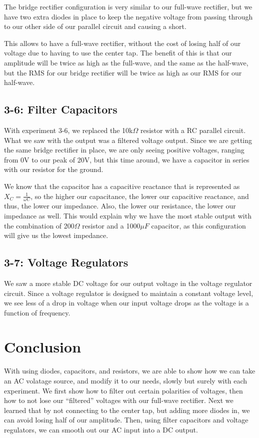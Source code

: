 \documentclass[%
 aip,
 jmp,
 amsmath,
 amssymb,
 reprint,%
 numerical,
 longbibliography,
]{revtex4-1}
\begin{document}
	The bridge rectifier configuration is very similar to our full-wave rectifier, but we have
	two extra diodes in place to keep the negative voltage from passing through to our other 
	side of our parallel circuit and causing a short.
	
	This allows to have a full-wave rectifier, without the cost of losing half of our voltage due
	to having to use the center tap. The benefit of this is that our amplitude will be twice as 
	high as the full-wave, and the same as the half-wave, but the RMS for our bridge rectifier
	will be twice as high as our RMS for our half-wave. 
		
	\subsection{3-6: Filter Capacitors}
	
	With experiment 3-6, we replaced the 10k$\Omega$ resistor with a RC parallel circuit. What
	we saw with the output was a filtered voltage output. Since we are getting the same bridge
	rectifier in place, we are only seeing positive voltages, ranging from 0V to our peak of 20V,
	but this time around, we have a capacitor in series with our resistor for the ground. 
	
	We know that the capacitor has a capacitive reactance that is represented as
	$X_C = \frac{1}{\omega C}$, so the higher our capacitance, the lower our capacitive reactance,
	and thus, the lower our impedance. Also, the lower our resistance, the lower our impedance as
	well. This would explain why we have the most stable output with the combination of 200$\Omega$
	resistor and a 1000$\mu F$ capacitor, as this configuration will give us the lowest impedance. 
	
	\subsection{3-7: Voltage Regulators}
	
	We saw a more stable DC voltage for our output voltage in the voltage regulator circuit. Since 
	a voltage regulator is designed to maintain a constant voltage level, we see less of a drop in 
	voltage when our input voltage drops as the voltage is a function of frequency.

\section{Conclusion}

With using diodes, capacitors, and resistors, we are able to show how we can take an AC volatage
source, and modify it to our needs, slowly but surely with each experiment. We first show how to 
filter out certain polarities of voltages, then how to not lose our "`filtered"' voltages with our
full-wave rectifier. Next we learned that by not connecting to the center tap, but adding more diodes
in, we can avoid losing half of our amplitude. Then, using filter capacitors and voltage regulators, we
can smooth out our AC input into a DC output.
\end{document}
